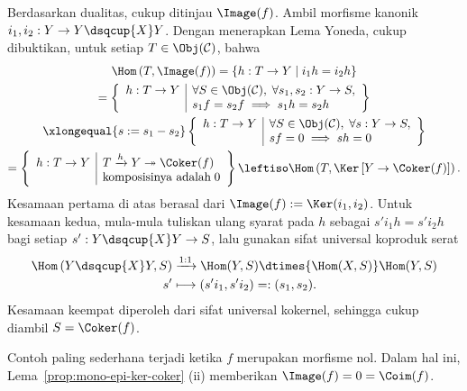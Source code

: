 \begin{bukti}
	Berdasarkan dualitas, cukup ditinjau $\Image(f)$. Ambil morfisme kanonik
	$i_1,i_2: Y \to Y \dsqcup{X} Y$. Dengan menerapkan Lema Yoneda, cukup
	dibuktikan, untuk setiap $T \in \Obj(\mathcal{C})$, bahwa
	\begin{multline*}
		\Hom\left( T, \Image(f) \right) = \left\{ h: T \to Y \;\middle|\; i_1 h = i_2 h \right\} \\
		= \left\{ \begin{array}{r|l}
			h: T \to Y & \forall S \in \Obj(\mathcal{C}),\; \forall s_1, s_2: Y \to S, \\
			& s_1 f = s_2 f \implies s_1 h = s_2 h
		\end{array}\right\} \\
		\xlongequal{s := s_1 - s_2} \left\{ \begin{array}{r|l}
			h: T \to Y & \forall S \in \Obj(\mathcal{C}),\; \forall s: Y \to S, \\
			& s f = 0 \implies sh = 0
		\end{array}\right\} \\
		= \left\{ \begin{array}{r|l}
			h: T \to Y & T \xrightarrow{h} Y \twoheadrightarrow \Coker(f) \\
			& \text{komposisinya adalah}\; 0
		\end{array}\right\}
		\leftiso \Hom\left( T, \Ker\left[ Y \to \Coker(f) \right] \right).
	\end{multline*}
	Kesamaan pertama di atas berasal dari
	$\Image(f):=\Ker(i_1,i_2)$. Untuk kesamaan kedua, mula-mula tuliskan ulang
	syarat pada $h$ sebagai $s'i_1h=s'i_2h$ bagi setiap
	$s': Y \dsqcup{X} Y \to S$, lalu gunakan sifat universal koproduk serat
	\begin{align*}
		\Hom\left( Y \dsqcup{X} Y, S \right) & \xrightarrow{1:1} \Hom(Y,S) \dtimes{\Hom(X,S)} \Hom(Y,S) \\
		s' & \longmapsto \left( s' i_1, s' i_2 \right) =: (s_1, s_2).
	\end{align*}
	Kesamaan keempat diperoleh dari sifat universal kokernel, sehingga cukup
	diambil $S=\Coker(f)$.
\end{bukti}

Contoh paling sederhana terjadi ketika $f$ merupakan morfisme nol. Dalam hal
ini, Lema~\ref{prop:mono-epi-ker-coker} (ii) memberikan
$\Image(f)=0=\Coim(f)$.

